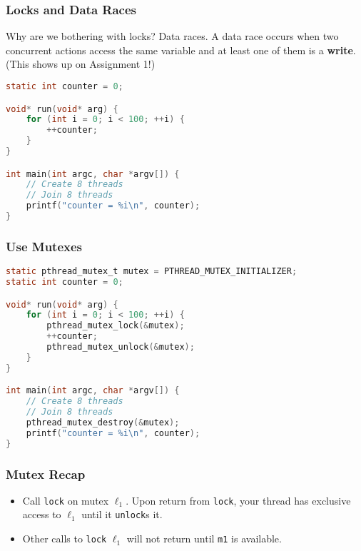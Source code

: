 \begin{frame}[fragile]
\frametitle{Locks and Data Races}

Why are we bothering with locks? Data races. A data race occurs when
two concurrent actions access the same variable and at least one of
them is a {\bf write}. (This shows up on Assignment 1!)

  \begin{lstlisting}[language=C]
static int counter = 0;

void* run(void* arg) {
    for (int i = 0; i < 100; ++i) {
        ++counter;
    }
}

int main(int argc, char *argv[]) {
    // Create 8 threads
    // Join 8 threads
    printf("counter = %i\n", counter);
}
  \end{lstlisting}


\end{frame}



\begin{frame}[fragile]
\frametitle{Use Mutexes}

 \begin{lstlisting}[language=C]
static pthread_mutex_t mutex = PTHREAD_MUTEX_INITIALIZER;
static int counter = 0;

void* run(void* arg) {
    for (int i = 0; i < 100; ++i) {
        pthread_mutex_lock(&mutex);
        ++counter;
        pthread_mutex_unlock(&mutex);
    }
}

int main(int argc, char *argv[]) {
    // Create 8 threads
    // Join 8 threads
    pthread_mutex_destroy(&mutex);
    printf("counter = %i\n", counter);
}
  \end{lstlisting}

\end{frame}



\begin{frame}
\frametitle{Mutex Recap}

\begin{itemize}
\item Call {\tt lock} on mutex $\ell_1$. Upon return from
      {\tt lock}, your thread has exclusive access to $\ell_1$ until it
      {\tt unlock}s it.
\item Other calls to {\tt lock} $\ell_1$ will not return
      until {\tt m1} is available.
\end{itemize}

\end{frame}



